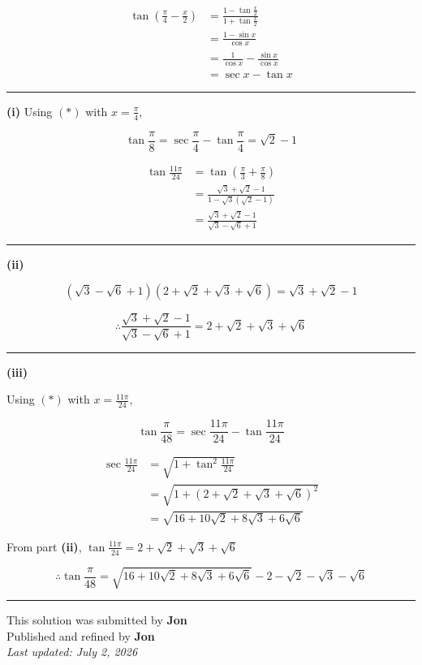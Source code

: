 \documentclass[12pt]{article}
\begin{document}
\newcommand{\ds}{\displaystyle}

\begin{align*}
\tan\left(\frac{\pi}{4}-\frac{x}{2}\right)
&=\frac{1-\tan\frac{x}{2}}{1+\tan\frac{x}{2}}\\
&=\frac{1-\sin x}{\cos x}\\
&=\frac1{\cos x}-\frac{\sin x}{\cos x}\\
&=\sec x-\tan x
\end{align*}

\bigskip\hrule\bigskip

\textbf{(i)} Using $(*)$ with $\ds x=\frac{\pi}{4}$,

$$\tan\frac{\pi}{8}=\sec\frac{\pi}{4}-\tan\frac{\pi}{4}=\sqrt2-1$$

\begin{align*}
\tan\frac{11\pi}{24}
&=\tan\left(\frac{\pi}{3}+\frac{\pi}{8}\right)\\
&=\frac{\sqrt3+\sqrt2-1}{1-\sqrt3(\sqrt2-1)}\\
&=\frac{\sqrt3+\sqrt2-1}{\sqrt3-\sqrt6+1}
\end{align*}

\bigskip\hrule\bigskip

\textbf{(ii)}

$$(\sqrt3-\sqrt6+1)(2+\sqrt2+\sqrt3+\sqrt6)=\sqrt3+\sqrt2-1$$


$$\therefore \frac{\sqrt3+\sqrt2-1}{\sqrt3-\sqrt6+1}=2+\sqrt2+\sqrt3+\sqrt6$$

\bigskip\hrule\bigskip

\textbf{(iii)}

Using $(*)$ with $\ds x=\frac{11\pi}{24}$,

$$\tan\frac\pi{48}=\sec\frac{11\pi}{24}-\tan\frac{11\pi}{24}$$

\begin{align*}
\sec\frac{11\pi}{24}
&=\sqrt{1+\tan^2\frac{11\pi}{24}}\\
&=\sqrt{1+(2+\sqrt2+\sqrt3+\sqrt6)^2}\\
&=\sqrt{16+10\sqrt2+8\sqrt3+6\sqrt6}
\end{align*}


From part \textbf{(ii)},  $\ds \tan\frac{11\pi}{24}=2+\sqrt2+\sqrt3+\sqrt6$


$$\therefore \tan\frac\pi{48}
=\sqrt{16+10\sqrt2+8\sqrt3+6\sqrt6}-2-\sqrt2-\sqrt3-\sqrt6$$

\bigskip
\hrule
\begin{center}
    This solution was submitted by \textbf{Jon}\\[4pt]
    Published and refined by \textbf{Jon}\\[8pt]
    \textit{Last updated: July 2, 2026}
\end{center}
\end{document}
